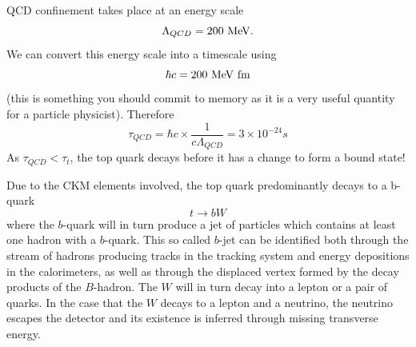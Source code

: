 QCD confinement takes place at an energy scale 
\[
\Lambda_{QCD}=200~{\rm MeV}.
\]
We can convert this energy scale into a timescale using 
\[
\hbar c=200~{\rm MeV~fm}
\]
(this is something you should commit to memory as it is a very useful quantity for a particle physicist).
Therefore
\[
\tau_{QCD}=\hbar c\times\frac{1}{c\Lambda_{QCD}}=3\times 10^{-24}s
\]
As $\tau_{QCD}<\tau_{t}$, the top quark decays before it has a change to form a bound state! 

Due to the CKM elements involved, the top quark predominantly decays to a b-quark 
\[t\rightarrow b W\]
where the $b$-quark will in turn produce a jet of particles which contains at least one hadron with a $b$-quark. This so called $b$-jet can be identified both through the stream of hadrons producing tracks in the tracking system and energy depositions in the calorimeters, as well as through the displaced vertex formed by the decay products of the $B$-hadron.
The $W$ will in turn decay into a lepton or a pair of quarks. In the case that the $W$ decays to a lepton and a neutrino, the neutrino escapes the detector and its existence is inferred through missing transverse energy.